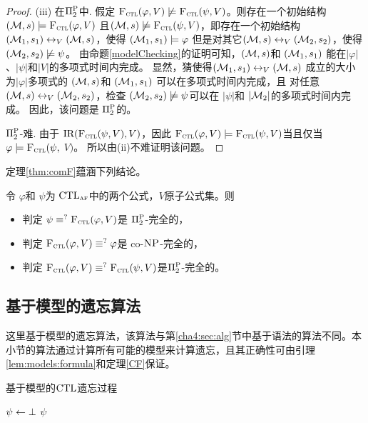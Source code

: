 \begin{proof}
	(iii) 在$\Pi_2^{\textsc{P}}$中. 假定 ${\textsc{F}_{\textsc{ctl}}}(\varphi, V) \not \models {\textsc{F}_{\textsc{ctl}}}(\psi, V)$。则存在一个初始结构 $({\cal M},s) 
	\models {\textsc{F}_{\textsc{ctl}}}(\varphi, V)$ 且$({\cal M},s) \not \models {\textsc{F}_{\textsc{ctl}}}(\psi, V)$，即存在一个初始结构$({\cal M}_1,s_1) \leftrightarrow_V ({\cal M},s)$，使得 $({\cal M}_1, s_1) \models \varphi$ 但是对其它$({\cal M}, s) \leftrightarrow_V ({\cal M}_2,s_2)$，使得 $({\cal M}_2, s_2) \not \models \psi$。
	由命题\ref{modelChecking}的证明可知，$({\cal M},s)$和 $({\cal M}_1,s_1)$ 能在$|\varphi|$、$|\psi|$和$|V|$的多项式时间内完成。 
	显然，猜使得$({\cal M}_1,s_1) \leftrightarrow_V ({\cal M},s)$ 成立的大小为$|\varphi|$多项式的 $({\cal M},s)$和 $({\cal M}_1,s_1)$ 可以在多项式时间内完成，且 对任意 $({\cal M}, s) \leftrightarrow_V ({\cal M}_2,s_2)$，检查 $({\cal M}_2,s_2) \not \models \psi$可以在 $|\psi|$和 $|{\cal M}_2|$的多项式时间内完成。
	因此，该问题是 $\Pi_2^{\textsc{P}}$的。
	
	$\Pi_2^{\textsc{P}}$-难. 由于 $\textrm{IR}({\textsc{F}_{\textsc{ctl}}}(\psi, V), V)$，因此 ${\textsc{F}_{\textsc{ctl}}}(\varphi, V) \models {\textsc{F}_{\textsc{ctl}}}(\psi, V)$当且仅当 $\varphi \models {\textsc{F}_{\textsc{ctl}}}(\psi,$ $V)$。 所以由(ii)不难证明该问题。
\end{proof}



定理\ref{thm:comF}蕴涵下列结论。
\begin{corollary}
	令 $\varphi$和 $\psi$为 $\textrm{CTL}_{\textsc{a} \textsc{f}}$中的两个公式，$V$原子公式集。则
	\begin{itemize}
		\item[(i)] 判定 $\psi \equiv^?{\textsc{F}_{\textsc{ctl}}}(\varphi, V)$是 $\Pi_2^{\textsc{P}}$-完全的，
		\item[(ii)] 判定 ${\textsc{F}_{\textsc{ctl}}}(\varphi, V) \equiv^? \varphi$是 co-$\textsc{NP}$-完全的，
		\item[(iii)] 判定 ${\textsc{F}_{\textsc{ctl}}}(\varphi, V) \equiv^? {\textsc{F}_{\textsc{ctl}}}(\psi, V)$是$\Pi_2^{\textsc{P}}$-完全的。
	\end{itemize}
\end{corollary}


\subsection{基于模型的遗忘算法}\label{chapter06:sec:algm}
这里基于模型的遗忘算法，该算法与第\ref{cha4:sec:alg}节中基于语法的算法不同。本小节的算法通过计算所有可能的模型来计算遗忘，且其正确性可由引理\ref{lem:models:formula}和定理\ref{CF}保证。


\begin{algorithm}[tb]
	\caption{\small 基于模型的$\textrm{CTL}$遗忘过程}%
	\label{alg:compute:forgetting:by:VB}
	\LinesNumbered
	$\psi \leftarrow \bot$\;
	\ForEach{$\cal A$ 和$\cal S$上的初始结构$\cal K$}{
		\lIf{${\cal K}\not\models\varphi$}{{\bf continue}} \\
		\ForEach{满足${\cal K}\lrto_{ V}{\cal K}'$的初始结构${\cal K}'$}{
			$\psi \lto \psi \lor {\cal F}_{\overline V}({\cal K}')$\;
		}
	}
	\Return $\psi$\;
\end{algorithm}



